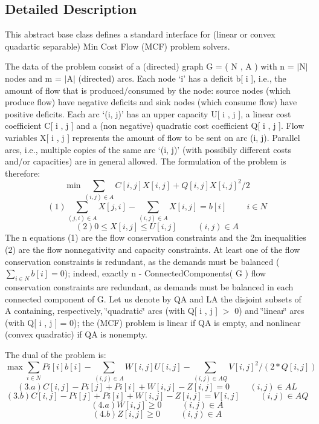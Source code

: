 \subsection{Detailed Description}
This abstract base class defines a standard interface for (linear or convex quadartic separable) Min Cost Flow (M\+CF) problem solvers.

The data of the problem consist of a (directed) graph G = ( N , A ) with n = $\vert$\+N$\vert$ nodes and m = $\vert$\+A$\vert$ (directed) arcs. Each node `i' has a deficit b\mbox{[} i \mbox{]}, i.\+e., the amount of flow that is produced/consumed by the node\+: source nodes (which produce flow) have negative deficits and sink nodes (which consume flow) have positive deficits. Each arc `(i, j)' has an upper capacity U\mbox{[} i , j \mbox{]}, a linear cost coefficient C\mbox{[} i , j \mbox{]} and a (non negative) quadratic cost coefficient Q\mbox{[} i , j \mbox{]}. Flow variables X\mbox{[} i , j \mbox{]} represents the amount of flow to be sent on arc (i, j). Parallel arcs, i.\+e., multiple copies of the same arc `(i, j)' (with possibily different costs and/or capacities) are in general allowed. The formulation of the problem is therefore\+: \[ \min \sum_{ (i, j) \in A } C[ i , j ] X[ i, j ] + Q[ i , j ] X[ i, j ]^2 / 2 \] \[ (1) \sum_{ (j, i) \in A } X[ j , i ] - \sum_{ (i, j) \in A } X[ i , j ] = b[ i ] \hspace{1cm} i \in N \] \[ (2) 0 \leq X[ i , j ] \leq U[ i , j ] \hspace{1cm} (i, j) \in A \] The n equations (1) are the flow conservation constraints and the 2m inequalities (2) are the flow nonnegativity and capacity constraints. At least one of the flow conservation constraints is redundant, as the demands must be balanced ( $\sum_{ i \in N } b[ i ] = 0$); indeed, exactly n -\/ Connected\+Components( G ) flow conservation constraints are redundant, as demands must be balanced in each connected component of G. Let us denote by QA and LA the disjoint subsets of A containing, respectively, \char`\"{}quadratic\char`\"{} arcs (with Q\mbox{[} i , j \mbox{]} $>$ 0) and \char`\"{}linear\char`\"{} arcs (with Q\mbox{[} i , j \mbox{]} = 0); the (M\+CF) problem is linear if QA is empty, and nonlinear (convex quadratic) if QA is nonempty.

The dual of the problem is\+: \[ \max \sum_{ i \in N } Pi[ i ] b[ i ] - \sum_{ (i, j) \in A } W[ i , j ] U[ i , j ] - \sum_{ (i, j) \in AQ } V[ i , j ]^2 / ( 2 * Q[ i , j ] ) \] \[ (3.a) C[ i , j ] - Pi[ j ] + Pi[ i ] + W[ i , j ] - Z[ i , j ] = 0 \hspace{1cm} (i, j) \in AL \] \[ (3.b) C[ i , j ] - Pi[ j ] + Pi[ i ] + W[ i , j ] - Z[ i , j ] = V[ i , j ] \hspace{1cm} (i, j) \in AQ \] \[ (4.a) W[ i , j ] \geq 0 \hspace{1cm} (i, j) \in A \] \[ (4.b) Z[ i , j ] \geq 0 \hspace{1cm} (i, j) \in A \]

